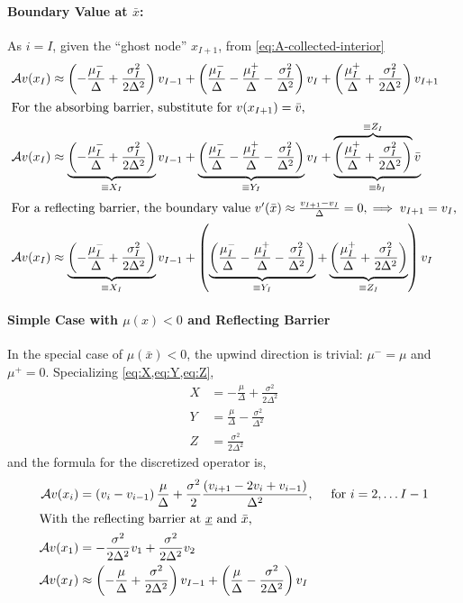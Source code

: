 \documentclass[11pt]{etk-article}
\begin{document}
\paragraph{Boundary Value at $\bar{x}$:}
As $i=I$, given the ``ghost node'' $x_{I+1}$, from \cref{eq:A-collected-interior}
\begin{align}
\mathcal{A} v(x_I)&\approx \left(-\frac{\mu_I^{-}}{\Delta} +\frac{\sigma_I^2}{2 \Delta^2}\right)v_{I-1} + \left(\frac{\mu_I^{-}}{\Delta} - \frac{\mu_I^{+}}{\Delta}-\frac{\sigma_I^2}{\Delta^2}\right)v_I + \left(\frac{\mu_I^{+}}{\Delta} + \frac{\sigma_I^2}{2 \Delta^2}\right)v_{I+1}\\
\intertext{For the absorbing barrier, substitute for $v(x_{I+1}) = \bar{v}$,}
\mathcal{A} v(x_I)&\approx \underbrace{\left(-\frac{\mu_I^{-}}{\Delta} +\frac{\sigma_I^2}{2 \Delta^2}\right)}_{\equiv X_I} v_{I-1} + \underbrace{\left(\frac{\mu_I^{-}}{\Delta} - \frac{\mu_I^{+}}{\Delta}-\frac{\sigma_I^2}{\Delta^2}\right)}_{\equiv Y_I} v_I + \underbrace{\overbrace{\left(\frac{\mu_I^{+}}{\Delta} + \frac{\sigma_I^2}{2 \Delta^2}\right)}^{\equiv Z_I}\bar{v}}_{\equiv b_I}\\
\intertext{For a reflecting barrier, the boundary value $v'(\bar{x}) \approx \frac{v_{I+1}-v_I}{\Delta} = 0, \implies v_{I+1} = v_I$,}
\mathcal{A} v(x_I)&\approx \underbrace{\left(-\frac{\mu_I^{-}}{\Delta} +\frac{\sigma_I^2}{2 \Delta^2}\right)}_{\equiv X_I} v_{I-1} + \left(\underbrace{\left(\frac{\mu_I^{-}}{\Delta} - \frac{\mu_I^{+}}{\Delta}-\frac{\sigma_I^2}{\Delta^2}\right)}_{\equiv Y_I} + \underbrace{\left(\frac{\mu_I^{+}}{\Delta} + \frac{\sigma_I^2}{2 \Delta^2}\right)}_{\equiv Z_I} \right) v_I 
\end{align}
\paragraph{Simple Case with $\mu(x) < 0$ and Reflecting Barrier}
In the special case of $\mu(\bar{x}) < 0$, the upwind direction is trivial: $\mu^{-}= \mu$ and $\mu^{+} = 0$.  Specializing \cref{eq:X,eq:Y,eq:Z},
\begin{align}
	X &= - \frac{\mu}{\Delta}+ \frac{\sigma^{2}}{2 \Delta^2}\label{eq:X-backwards} \\
	Y &= \frac{\mu}{\Delta} - \frac{\sigma^{2}}{\Delta^2}\label{eq:Y-backwards} \\
	Z &= \frac{\sigma^{2}}{2 \Delta^2}\label{eq:Z-backwards}
\end{align}
and the formula for the discretized operator is,
\begin{align}
	\mathcal{A} v(x_i)  &= \left(v_i-v_{i-1}\right)\frac{\mu}{\Delta} + \frac{\sigma^2}{2} \frac{\left(v_{i+1} - 2 v_i + v_{i-1}\right)}{\Delta^2},\quad \text{ for } i = 2,\ldots I-1\\
	\intertext{With the reflecting barrier at $\underline{x}$ and $\bar{x}$,}
	\mathcal{A} v(x_1) &= -\frac{\sigma^{2}}{2 \Delta^2}v_1 + \frac{\sigma^{2}}{2 \Delta^2} v_2\\
\mathcal{A} v(x_I)&\approx \left(-\frac{\mu}{\Delta} +\frac{\sigma^2}{2 \Delta^2}\right) v_{I-1} + \left(\frac{\mu}{\Delta} - \frac{\sigma^2}{2 \Delta^2}\right) v_I 
\end{align}
\end{document}
